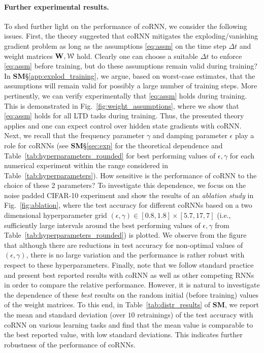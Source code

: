 \documentclass{article} \usepackage{iclr2021_conference,times}
\newcommand{\cW}{\EuScript{W}}
\newcommand{\bW}{{\bf W}}
\newcommand{\ep}{\epsilon}
\newcommand{\Dt}{{\Delta t}}
\newcommand{\fref}[1] {Fig.~\ref{#1}}
\newcommand{\Tref}[1]{Table~\ref{#1}}
\begin{document}
\paragraph{Further experimental results.}
To shed further light on the performance of coRNN, we consider the following issues. First, the theory suggested that coRNN mitigates the exploding/vanishing gradient problem as long as the assumptions \eqref{eq:assm} on the time step $\Dt$ and weight matrices $\bW,\cW$ hold. Clearly one can choose a suitable $\Dt$ to enforce \eqref{eq:assm} before training, but do these assumptions remain valid during training? In {\bf SM}\S\ref{app:explod_training}, we argue, based on worst-case estimates, that the assumptions will remain valid for possibly a large number of training steps. More pertinently, we can verify experimentally that \eqref{eq:assm} holds during training. This is demonstrated in \fref{fig:weight_assumptions}, where we show that \eqref{eq:assm} holds for all LTD tasks during training. Thus, the presented theory applies and one can expect control over hidden state gradients with coRNN. Next, we recall that the frequency parameter $\gamma$ and damping parameter $\ep$ play a role for coRNNs (see {\bf SM}\S\ref{sec:exp} for the theoretical dependence and \Tref{tab:hyperparameters_rounded} for best performing values of $\ep,\gamma$ for each numerical experiment within the range considered in \Tref{tab:hyperparameters}). How sensitive is the performance of coRNN to the choice of these 2 parameters? To investigate this dependence, we focus on the noise padded CIFAR-10 experiment and show the results of an \emph{ablation study} in \fref{fig:ablation}, where the test accuracy for different coRNNs based on a two dimensional hyperparameter grid $(\epsilon,\gamma) \in [0.8,1.8]\times[5.7,17,7]$ (i.e., sufficiently large intervals around the best performing values of $\ep,\gamma$ from \Tref{tab:hyperparameters_rounded}) is plotted. We observe from the figure that although there are reductions in test accuracy for non-optimal values of $(\ep,\gamma)$, there is no large variation and the performance is rather robust with respect to these hyperparameters. Finally, note that we follow standard practice and present best reported results with coRNN as well as other competing RNNs in order to compare the relative performance. However, it is natural to investigate the dependence of these \emph{best} results on the random initial (before training) values of the weight matrices. To this end, in \Tref{tab:distr_results} of {\bf SM}, we report the mean and standard deviation (over $10$ retrainings) of the test accuracy with coRNN on various learning tasks and find that the mean value is comparable to the best reported value, with low standard deviations. This indicates further robustness of the performance of coRNNs. 
\end{document}
